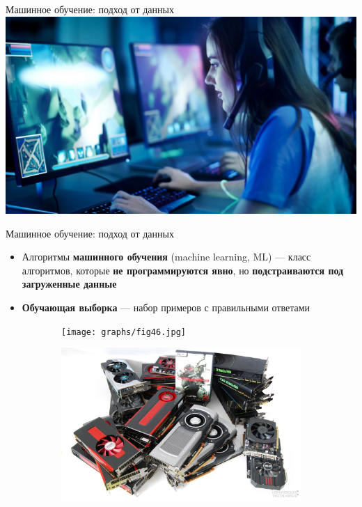 \documentclass[aspectratio=169]{beamer}
\begin{document}
\begin{frame}{Машинное обучение: подход от данных}
    \pause{}
    \centering
    \includegraphics[width=0.715\linewidth]{graphs/fig23.jpg}
\end{frame}

\begin{frame}{Машинное обучение: подход от данных}
    \begin{itemize}
        \item Алгоритмы \textbf{машинного обучения} (machine learning, ML) ---
         класс алгоритмов, которые \textbf{не программируются явно}, но
         \textbf{подстраиваются под загруженные данные}
        \pause{}
        \item \textbf{Обучающая выборка} --- набор примеров с правильными
         ответами
    \end{itemize}
    \pause{}
    \begin{figure}
        \begin{subfigure}[b]{0.1\linewidth}
            \texttt{[image: graphs/fig46.jpg]}
        \end{subfigure}
        \begin{subfigure}[b]{0.1\linewidth}
            \includegraphics[width=\linewidth]{graphs/fig24.jpg}

\end{subfigure}
\end{figure}
\end{frame}
\end{document}
